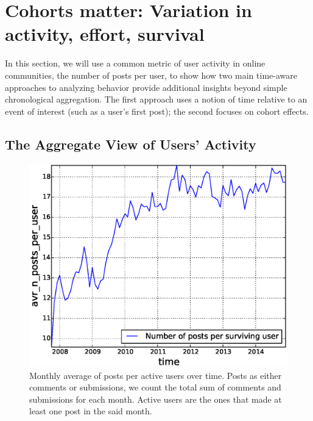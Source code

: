 \section{Cohorts matter: Variation in activity, effort, survival}

In this section, we will use a common metric of user activity in online communities, the number of posts per user, to show how two main time-aware approaches to analyzing behavior provide additional insights beyond simple chronological aggregation.  The first approach uses a notion of time relative to an event of interest (such as a user's first post); the second focuses on cohort effects.

\subsection{The Aggregate View of Users' Activity}

\begin{figure}[!tb]
\centering
\includegraphics[scale=0.4]{./images/avr_posts_per_user_over_time_total.eps}
\caption{Monthly average of posts per active users over time. Posts as either comments or submissions, we count the total sum of comments and submissions for each month. Active users are the ones that made at least one post in the said month. }
\label{fig:avr_posts_per_user_over_time_total}
\end{figure}

